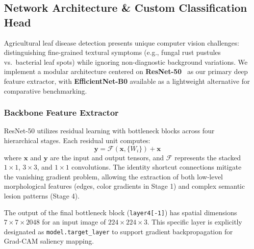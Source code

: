 \subsection{Network Architecture \& Custom Classification Head}
\label{subsec:architecture}

Agricultural leaf disease detection presents unique computer vision challenges: distinguishing fine-grained textural symptoms (e.g., fungal rust pustules vs.\ bacterial leaf spots) while ignoring non-diagnostic background variations. We implement a modular architecture centered on \textbf{ResNet-50}~\cite{resnet} as our primary deep feature extractor, with \textbf{EfficientNet-B0} available as a lightweight alternative for comparative benchmarking.

\subsubsection{Backbone Feature Extractor}
ResNet-50 utilizes residual learning with bottleneck blocks across four hierarchical stages. Each residual unit computes:
\begin{equation}
    \mathbf{y} = \mathcal{F}(\mathbf{x}, \{W_i\}) + \mathbf{x}
\end{equation}
where \(\mathbf{x}\) and \(\mathbf{y}\) are the input and output tensors, and \(\mathcal{F}\) represents the stacked $1\times 1$, $3\times 3$, and $1\times 1$ convolutions. The identity shortcut connections mitigate the vanishing gradient problem, allowing the extraction of both low-level morphological features (edges, color gradients in Stage 1) and complex semantic lesion patterns (Stage 4). 

The output of the final bottleneck block (\texttt{layer4[-1]}) has spatial dimensions $7 \times 7 \times 2048$ for an input image of $224 \times 224 \times 3$. This specific layer is explicitly designated as \texttt{model.target\_layer} to support gradient backpropagation for Grad-CAM saliency mapping.

